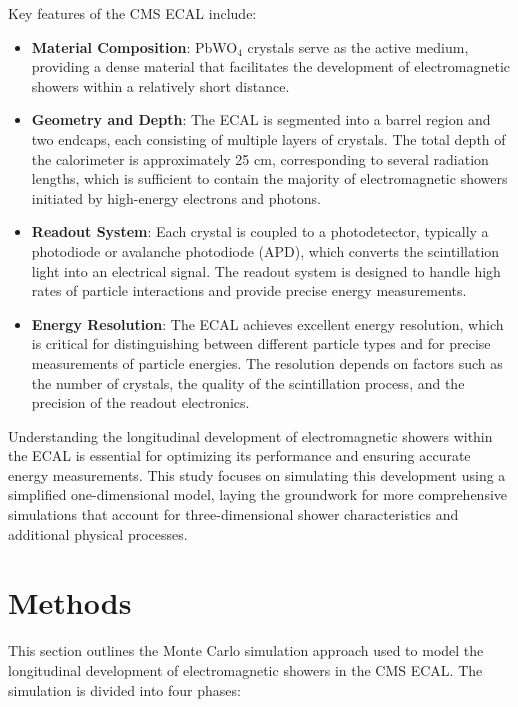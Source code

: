 \documentclass[twocolumn]{aastex631}
\begin{document}
Key features of the CMS ECAL include:

\begin{itemize}
    \item \textbf{Material Composition}: PbWO\(_4\) crystals serve as the active medium, providing a dense material that facilitates the development of electromagnetic showers within a relatively short distance.
    \item \textbf{Geometry and Depth}: The ECAL is segmented into a barrel region and two endcaps, each consisting of multiple layers of crystals. The total depth of the calorimeter is approximately 25 cm, corresponding to several radiation lengths, which is sufficient to contain the majority of electromagnetic showers initiated by high-energy electrons and photons.
    \item \textbf{Readout System}: Each crystal is coupled to a photodetector, typically a photodiode or avalanche photodiode (APD), which converts the scintillation light into an electrical signal. The readout system is designed to handle high rates of particle interactions and provide precise energy measurements.
    \item \textbf{Energy Resolution}: The ECAL achieves excellent energy resolution, which is critical for distinguishing between different particle types and for precise measurements of particle energies. The resolution depends on factors such as the number of crystals, the quality of the scintillation process, and the precision of the readout electronics.
\end{itemize}

Understanding the longitudinal development of electromagnetic showers within the ECAL is essential for optimizing its performance and ensuring accurate energy measurements. This study focuses on simulating this development using a simplified one-dimensional model, laying the groundwork for more comprehensive simulations that account for three-dimensional shower characteristics and additional physical processes.

\section{Methods}\label{sec:methods}

This section outlines the Monte Carlo simulation approach used to model the longitudinal development of electromagnetic showers in the CMS ECAL. The simulation is divided into four phases:
\end{document}
